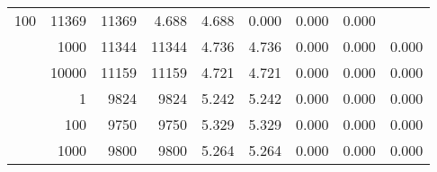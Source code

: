 \begin{table}
\begin{tabular}{rrrrrrrrr}
					\multirow{ 1 }{*}{ 100 } &
					
						
							    
							     11369  & 11369  
	                           & 4.688 & 4.688 & 0.000
	                           & 0.000 & 0.000  \\
	                
	            
					 &  
					 
					\multirow{ 1 }{*}{ 1000 } &
					
						
							    
							     11344  & 11344  
	                           & 4.736 & 4.736 & 0.000
	                           & 0.000 & 0.000  \\
	                
	            
					 &  
					 
					\multirow{ 1 }{*}{ 10000 } &
					
						
							    
							     11159  & 11159  
	                           & 4.721 & 4.721 & 0.000
	                           & 0.000 & 0.000  \\
	                
	            
	        
				\noalign{\smallskip}\hline
				\multirow{ 4 }{*}{ 250000 } &
				
					
					 
					\multirow{ 1 }{*}{ 1 } &
					
						
							    
							     9824  & 9824  
	                           & 5.242 & 5.242 & 0.000
	                           & 0.000 & 0.000  \\
	                
	            
					 &  
					 
					\multirow{ 1 }{*}{ 100 } &
					
						
							    
							     9750  & 9750  
	                           & 5.329 & 5.329 & 0.000
	                           & 0.000 & 0.000  \\
	                
	            
					 &  
					 
					\multirow{ 1 }{*}{ 1000 } &
					
						
							    
							     9800  & 9800  
	                           & 5.264 & 5.264 & 0.000
	                           & 0.000 & 0.000  \\
	                

\end{tabular}
\end{table}

